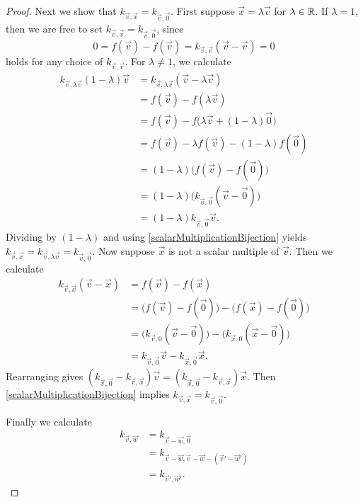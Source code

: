 \begin{proof}
Next we show that $k_{\vec{v},\vec{x}} = k_{\vec{v},\vec{0}}$. First suppose $\vec{x} = \lambda \vec{v}$ for $\lambda \in \mathbb{R}$. If $\lambda = 1$, then we are free to set $k_{\vec{v},\vec{v}} = k_{\vec{v}, \vec{0}}$, since
\[ 0 = f(\vec{v}) - f(\vec{v}) = k_{\vec{v},\vec{v}}(\vec{v} - \vec{v}) = 0 \]
holds for any choice of $k_{\vec{v},\vec{v}}$. For $\lambda \neq 1$, we calculate
\begin{align*}
k_{\vec{v},\lambda \vec{v}}(1-\lambda)\vec{v} &= k_{\vec{v},\lambda \vec{v}}(\vec{v}-\lambda \vec{v}) \\
&= f(\vec{v})-f(\lambda \vec{v}) \\
&= f(\vec{v})-f\big(\lambda \vec{v} + (1-\lambda)\vec{0}\big) \\
&= f(\vec{v})- \lambda f(\vec{v}) - (1-\lambda)f(\vec{0}) \\
&= (1-\lambda)\big(f(\vec{v})- f(\vec{0})\big) \\
&= (1-\lambda)\big(k_{\vec{v},\vec{0}}(\vec{v} - \vec{0})\big) \\
&= (1-\lambda)k_{\vec{v},\vec{0}}\vec{v}.
\end{align*}
Dividing by $(1-\lambda)$ and using \ref{scalarMultiplicationBijection} yields $k_{\vec{v}, \vec{x}} = k_{\vec{v},\lambda \vec{v}} = k_{\vec{v},\vec{0}}$.
Now suppose $\vec{x}$ is not a scalar multiple of $\vec{v}$. Then we calculate
\begin{align*}
k_{\vec{v}, \vec{x}}(\vec{v}- \vec{x}) &= f(\vec{v}) - f(\vec{x}) \\
&= \big(f(\vec{v}) - f(\vec{0})\big) - \big(f(\vec{x}) - f(\vec{0})\big) \\
&= \big(k_{\vec{v}, 0}(\vec{v} - \vec{0})\big) - \big(k_{\vec{x}, 0}(\vec{x} - \vec{0})\big) \\
&= k_{\vec{v},\vec{0}}\vec{v} - k_{\vec{x}, \vec{0}}\vec{x}.
\end{align*}
Rearranging gives $(k_{\vec{v},\vec{0}} - k_{\vec{v},\vec{x}})\vec{v} = (k_{\vec{x},\vec{0}} - k_{\vec{v},\vec{x}})\vec{x}$. Then \ref{scalarMultiplicationBijection} implies $k_{\vec{v}, \vec{x}} = k_{\vec{v}, \vec{0}}$.

Finally we calculate
\begin{align*}
k_{\vec{v}, \vec{w}} &= k_{\vec{v} - \vec{w}, \vec{0}} \\
&= k_{\vec{v} - \vec{w}, \vec{v} - \vec{w} - (\vec{v}' - \vec{w}')} \\
&= k_{\vec{v}',\vec{w}'}.
\end{align*}
\end{proof}

